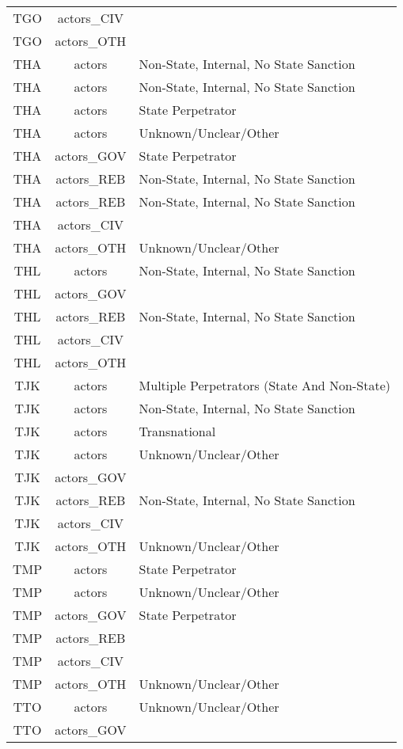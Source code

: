 \documentclass[12pt]{article}
\begin{document}
\begin{center}
\begin{longtable}{|c|c|p{10cm}|}
  TGO & actors\_CIV &  \\ 
  TGO & actors\_OTH &  \\ 
  THA & actors & Non-State, Internal, No State Sanction \\ 
  THA & actors & Non-State, Internal, No State Sanction \\ 
  THA & actors & State Perpetrator \\ 
  THA & actors & Unknown/Unclear/Other \\ 
  THA & actors\_GOV & State Perpetrator \\ 
  THA & actors\_REB & Non-State, Internal, No State Sanction \\ 
  THA & actors\_REB & Non-State, Internal, No State Sanction \\ 
  THA & actors\_CIV &  \\ 
  THA & actors\_OTH & Unknown/Unclear/Other \\ 
  THL & actors & Non-State, Internal, No State Sanction \\ 
  THL & actors\_GOV &  \\ 
  THL & actors\_REB & Non-State, Internal, No State Sanction \\ 
  THL & actors\_CIV &  \\ 
  THL & actors\_OTH &  \\ 
  TJK & actors & Multiple Perpetrators (State And Non-State) \\ 
  TJK & actors & Non-State, Internal, No State Sanction \\ 
  TJK & actors & Transnational \\ 
  TJK & actors & Unknown/Unclear/Other \\ 
  TJK & actors\_GOV &  \\ 
  TJK & actors\_REB & Non-State, Internal, No State Sanction \\ 
  TJK & actors\_CIV &  \\ 
  TJK & actors\_OTH & Unknown/Unclear/Other \\ 
  TMP & actors & State Perpetrator \\ 
  TMP & actors & Unknown/Unclear/Other \\ 
  TMP & actors\_GOV & State Perpetrator \\ 
  TMP & actors\_REB &  \\ 
  TMP & actors\_CIV &  \\ 
  TMP & actors\_OTH & Unknown/Unclear/Other \\ 
  TTO & actors & Unknown/Unclear/Other \\ 
  TTO & actors\_GOV &  \\ 

\end{longtable}
\end{center}
\end{document}
